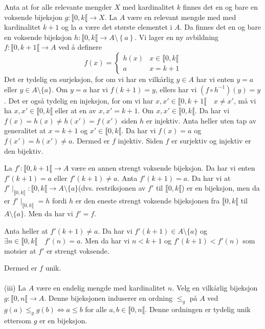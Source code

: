 \documentclass{article}[norsk]
\begin{document}
Anta at for alle relevante mengder $X$ med kardinalitet $k$ finnes det en og bare en voksende bijeksjon $g:\llbracket 0,k\llbracket \rightarrow X$. La $A$ være en relevant mengde med med kardinalitet $k + 1$ og la $a$ være det største elementet i $A$. Da finnes det en og bare en voksende bijeksjon $h:\llbracket 0,k\llbracket\rightarrow A\setminus \left\{a\right\}$. Vi lager en ny avbildning $f:\llbracket 0,k+1\llbracket\rightarrow A$ ved å definere
\begin{equation*}
f(x)=\begin{cases}
	h(x)	&x\in \llbracket 0,k\llbracket\\
    a		&x=k+1%
\end{cases}
\end{equation*}
Det er tydelig en surjeksjon, for om vi har en vilkårlig $y\in A$ har vi enten $y=a$ eller $y\in A\setminus \{a\}$. Om $y=a$ har vi $f(k+1)=y$, ellers har vi $(f\circ h^{-1})(y)=y$. Det er også tydelig en injeksjon, for om vi har $x,x'\in \llbracket 0,k+1\llbracket\quad x\neq x'$, må vi ha $x,x'\in \llbracket 0,k\llbracket$ eller at en av $x,x'=k + 1$. Om $x,x'\in\llbracket 0,k\llbracket$. Da har vi $f(x)=h(x)\neq h(x')=f(x')$ siden $h$ er injektiv. Anta heller uten tap av generalitet at $x=k+1$ og $x'\in\llbracket 0,k\llbracket$. Da har vi $f(x)=a$ og $f(x')=h(x')\neq a$. Dermed er $f$ injektiv. Siden $f$ er surjektiv og injektiv er den bijektiv.

La $f':\llbracket 0,k+1\llbracket\rightarrow A$ være en annen strengt voksende bijeksjon. Da har vi enten $f'(k+1)=a$ eller $f'(k+1)\neq a$. Anta $f'(k+1)=a$. Da har vi at $f'\mid_{\llbracket 0,k\llbracket}:\llbracket 0,k\llbracket\rightarrow A\setminus\{a\}$(dvs. restriksjonen av $f'$ til $\llbracket 0,k\llbracket$) er en bijeksjon, men da er $f'\mid_{\llbracket 0,k\llbracket}=h$ fordi $h$ er den eneste strengt voksende bijeksjonen fra $\llbracket 0,k\llbracket$ til $A\setminus \{a\}$. Men da har vi $f'=f$. 

Anta heller at $f'(k+1)\neq a$.  Da har vi $f'(k+1)\in A\setminus\{a\}$ og $\exists n\in\llbracket 0,k\llbracket\quad f'(n)=a$. Men da har vi $n< k+1$ og $f'(k+1)<f'(n)$ som motsier at $f'$ er strengt voksende.

Dermed er $f$ unik.
\\\\
(iii) %
La $A$ være en endelig mengde med kardinalitet $n$. Velg en vilkårlig bijeksjon $g:\llbracket 0,n\llbracket\rightarrow A$. Denne bijeksjonen induserer en ordning $\leq_g$ på $A$ ved $g(a)\leq_g g(b)\Longleftrightarrow a\leq b$ for alle $a,b\in \llbracket 0,n\llbracket$. Denne ordningen er tydelig unik ettersom $g$ er en bijeksjon.
\end{document}
